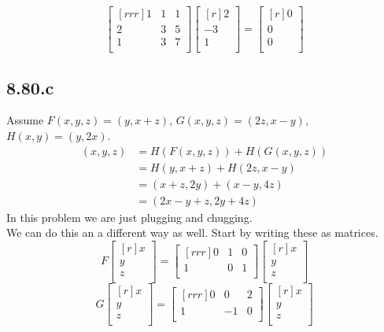 \documentclass{report}
\begin{document}
\[ \begin{bmatrix}[rrr]1&1&1\\2&3&5\\1&3&7\\\end{bmatrix}\begin{bmatrix}[r]2\\-3\\1\\\end{bmatrix} = \begin{bmatrix}[r]0\\0\\0\\\end{bmatrix} \]

\subsection{8.80.c}
Assume $F(x,y,z)=(y,x+z)$, $G(x,y,z)=(2z,x-y)$, $H(x,y)=(y,2x)$.\\
\begin{align*}
[H \circ (F+G)](x,y,z) &= H(F(x,y,z))+H(G(x,y,z))\\
&= H(y,x+z)+H(2z,x-y)\\
&= (x+z,2y)+(x-y,4z)\\
&= (2x-y+z,2y+4z)
\end{align*}
In this problem we are just plugging and chugging.\\
We can do this an a different way as well. Start by writing these as matrices.
\[ F\begin{bmatrix}[r]x\\y\\z\\\end{bmatrix}=\begin{bmatrix}[rrr]0&1&0\\1&0&1\\\end{bmatrix}\begin{bmatrix}[r]x\\y\\z\\\end{bmatrix}\]
\[ G\begin{bmatrix}[r]x\\y\\z\\\end{bmatrix}=\begin{bmatrix}[rrr]0&0&2\\1&-1&0\\\end{bmatrix}\begin{bmatrix}[r]x\\y\\z\\\end{bmatrix}\]
\end{document}
